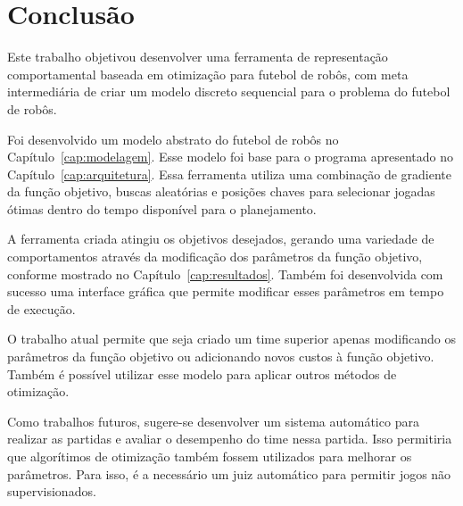 \chapter{Conclusão}\label{cap:conclusao}

Este trabalho objetivou desenvolver uma ferramenta de representação
comportamental baseada em otimização para futebol de robôs, com meta
intermediária de criar um modelo discreto sequencial para o problema do futebol
de robôs.

Foi desenvolvido um modelo abstrato do futebol de robôs no
Capítulo~\ref{cap:modelagem}.  Esse modelo foi base para o programa apresentado
no Capítulo~\ref{cap:arquitetura}.  Essa ferramenta utiliza uma combinação de
gradiente da função objetivo, buscas aleatórias e posições chaves para
selecionar jogadas ótimas dentro do tempo disponível para o planejamento.

A ferramenta criada atingiu os objetivos desejados, gerando uma variedade de
comportamentos através da modificação dos parâmetros da função objetivo,
conforme mostrado no Capítulo~\ref{cap:resultados}.  Também foi desenvolvida com
sucesso uma interface gráfica que permite modificar esses parâmetros em tempo de
execução.

O trabalho atual permite que seja criado um time superior apenas modificando os
parâmetros da função objetivo ou adicionando novos custos à função objetivo.
Também é possível utilizar esse modelo para aplicar outros métodos de otimização.

Como trabalhos futuros, sugere-se desenvolver um sistema automático para
realizar as partidas e avaliar o desempenho do time nessa partida.  Isso
permitiria que algorítimos de otimização também fossem utilizados para
melhorar os parâmetros.  Para isso, é a necessário um juiz automático
para permitir jogos não supervisionados.

